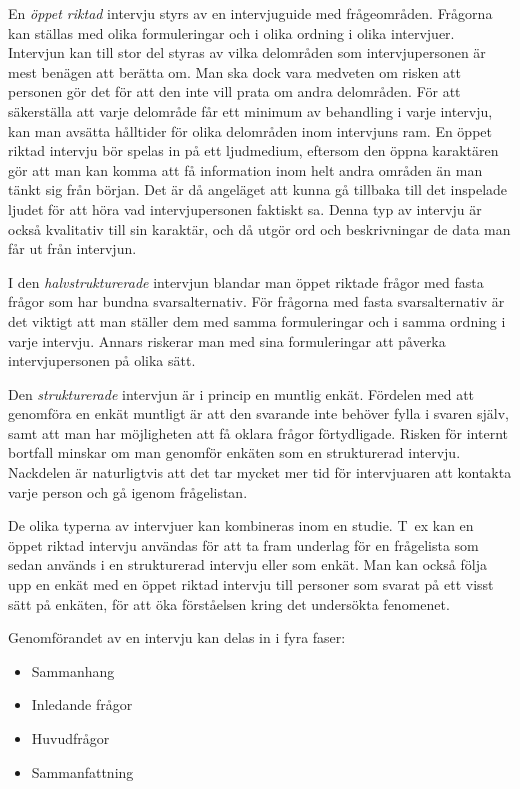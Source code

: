 En \emph{öppet riktad} intervju styrs av en intervjuguide med
frågeområden. Frågorna kan ställas med olika formuleringar och i olika
ordning i olika intervjuer. Intervjun kan till stor del styras av vilka
delområden som intervjupersonen är mest benägen att berätta om. Man ska
dock vara medveten om risken att personen gör det för att den inte vill
prata om andra delområden. För att säkerställa att varje delområde får
ett minimum av behandling i varje intervju, kan man avsätta hålltider
för olika delområden inom intervjuns ram. En öppet riktad intervju bör
spelas in på ett ljudmedium, eftersom den öppna karaktären gör att man
kan komma att få information inom helt andra områden än man tänkt sig
från början. Det är då angeläget att kunna gå tillbaka till det
inspelade ljudet för att höra vad intervjupersonen faktiskt sa. Denna
typ av intervju är också kvalitativ till sin karaktär, och då utgör ord
och beskrivningar de data man får ut från intervjun.

I den \emph{halvstrukturerade} intervjun blandar man öppet riktade
frågor med fasta frågor som har bundna svarsalternativ. För frågorna med
fasta svarsalternativ är det viktigt att man ställer dem med samma
formuleringar och i samma ordning i varje intervju. Annars riskerar man
med sina formuleringar att påverka intervjupersonen på olika sätt.

Den \emph{strukturerade} intervjun är i princip en muntlig enkät.
Fördelen med att genomföra en enkät muntligt är att den svarande inte
behöver fylla i svaren själv, samt att man har möjligheten att få oklara
frågor förtydligade. Risken för internt bortfall minskar om man genomför
enkäten som en strukturerad intervju. Nackdelen är naturligtvis att det
tar mycket mer tid för intervjuaren att kontakta varje person och gå
igenom frågelistan.

De olika typerna av intervjuer kan kombineras inom en studie. T~ex kan
en öppet riktad intervju användas för att ta fram underlag för en
frågelista som sedan används i en strukturerad intervju eller som enkät.
Man kan också följa upp en enkät med en öppet riktad intervju till
personer som svarat på ett visst sätt på enkäten, för att öka
förståelsen kring det undersökta fenomenet.

Genomförandet av en intervju kan delas in i fyra faser:

\begin{itemize}
\item
  Sammanhang
\item
  Inledande frågor
\item
  Huvudfrågor
\item
  Sammanfattning
\end{itemize}

